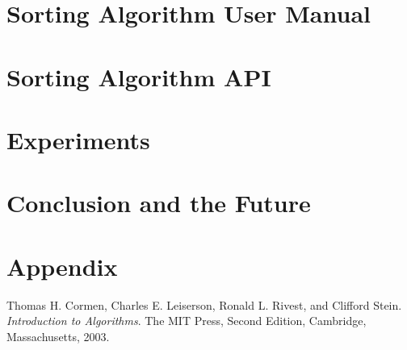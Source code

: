 \documentclass[refman]{scrartcl}
\begin{document}

\newpage
%

%

%

%
%
%
\section{Sorting Algorithm User Manual}
\section{Sorting Algorithm API}

\section{Experiments}
\section{Conclusion and the Future}
\newpage
\section{Appendix}
\begin{thebibliography}{9}
        Thomas H. Cormen, Charles E. Leiserson, Ronald L. Rivest, and Clifford Stein. 
        \textit{Introduction to Algorithms}. 
        The MIT Press, Second Edition, Cambridge, Massachusetts, 2003.
%
\end{thebibliography}
\end{document}

